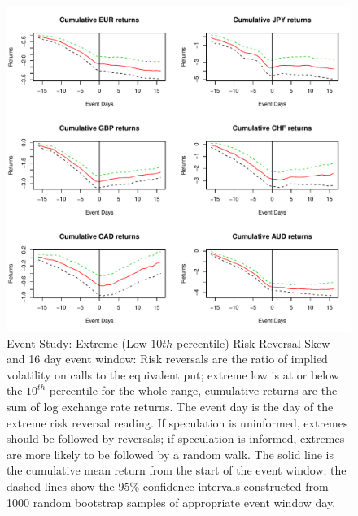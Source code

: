 \documentclass{article}
\begin{document}
\begin{figure}
\graphicspath{{../Figures/}}
\centering
\includegraphics[scale=0.8]{RRCum16a}
\caption{Event Study: Extreme (Low $10{th}$ percentile) Risk Reversal Skew and 16 day event window: Risk reversals are the ratio of implied volatility on calls to the equivalent put; extreme low is at or below the $10^{th}$ percentile for the whole range, cumulative returns are the sum of log exchange rate returns. The event day is the day of the extreme risk reversal reading.  If speculation is uninformed, extremes should be followed by reversals; if speculation is informed, extremes are more likely to be followed by a random walk. The solid line is the cumulative mean return from the start of the event window; the dashed lines show the 95\% confidence intervals constructed from 1000 random bootstrap samples of appropriate event window day.}
\label{fig:ES2}
\end{figure}
\end{document}

